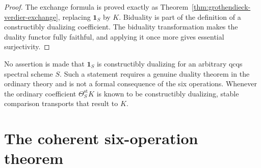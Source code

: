 \begin{proof}
The exchange formula is proved exactly as
Theorem~\ref{thm:grothendieck-verdier-exchange}, replacing \(\mathbf1_S\)
by \(K\).  Biduality is part of the definition of a constructibly dualizing
coefficient.  The biduality transformation makes the duality functor fully
faithful, and applying it once more gives essential surjectivity.
\end{proof}

\begin{remark}
\label{rem:biduality-scope}
No assertion is made that \(\mathbf1_S\) is constructibly dualizing for an
arbitrary qcqs spectral scheme \(S\).  Such a statement requires a genuine
duality theorem in the ordinary theory and is not a formal consequence of
the six operations.  Whenever the ordinary coefficient
\(\Theta_S^{\mathrm{st}}K\) is known to be constructibly dualizing, stable
comparison transports that result to \(K\).
\end{remark}

\section{The coherent six-operation theorem}
\label{sec:coherent-six-operation-theorem}

